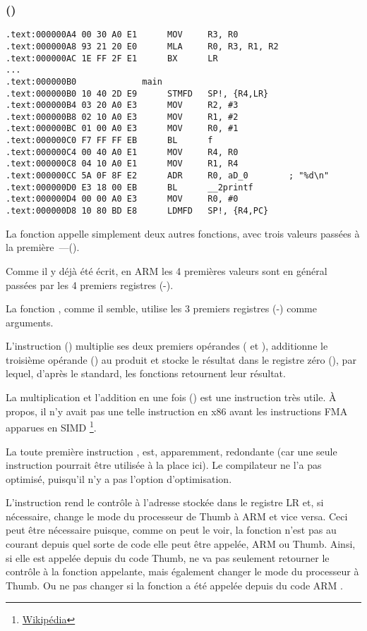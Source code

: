 \subsubsection{\NonOptimizingKeilVI (\ARMMode)}

\begin{lstlisting}[style=customasmARM]
.text:000000A4 00 30 A0 E1      MOV     R3, R0
.text:000000A8 93 21 20 E0      MLA     R0, R3, R1, R2
.text:000000AC 1E FF 2F E1      BX      LR
...
.text:000000B0             main
.text:000000B0 10 40 2D E9      STMFD   SP!, {R4,LR}
.text:000000B4 03 20 A0 E3      MOV     R2, #3
.text:000000B8 02 10 A0 E3      MOV     R1, #2
.text:000000BC 01 00 A0 E3      MOV     R0, #1
.text:000000C0 F7 FF FF EB      BL      f
.text:000000C4 00 40 A0 E1      MOV     R4, R0
.text:000000C8 04 10 A0 E1      MOV     R1, R4
.text:000000CC 5A 0F 8F E2      ADR     R0, aD_0        ; "%d\n"
.text:000000D0 E3 18 00 EB      BL      __2printf
.text:000000D4 00 00 A0 E3      MOV     R0, #0
.text:000000D8 10 80 BD E8      LDMFD   SP!, {R4,PC}
\end{lstlisting}

La fonction \main appelle simplement deux autres fonctions, avec trois valeurs passées
à la première~---(\ttf).

Comme il y déjà été écrit, en ARM les 4 premières valeurs sont en général
passées par les 4 premiers registres (-).

La fonction \ttf, comme il semble, utilise les 3 premiers registres (-) comme arguments. 

L'instruction  () multiplie ses deux premiers opérandes
( et ), additionne le troisième opérande () au produit et stocke
le résultat dans le registre zéro (), par lequel, d'après le standard, les
fonctions retournent leur résultat.

La multiplication et l'addition en une fois ()
est une instruction très utile. À propos, il n'y avait pas une telle instruction en
x86 avant les instructions FMA apparues en SIMD
\footnote{\href{http://go.yurichev.com/17103}{Wikipédia}}.

La toute première instruction , est, apparemment, redondante (car
une seule instruction  pourrait être utilisée à la place ici).
Le compilateur ne l'a pas optimisé, puisqu'il n'y a pas l'option d'optimisation.


L'instruction  rend le contrôle à l'adresse stockée dans le registre \ac{LR}
et, si nécessaire, change le mode du processeur de Thumb à ARM et vice versa.
Ceci peut être nécessaire puisque, comme on peut le voir, la fonction \ttf n'est
pas au courant depuis quel sorte de code elle peut être appelée, ARM ou Thumb.
Ainsi, si elle est appelée depuis du code Thumb,  ne va pas seulement retourner
le contrôle à la fonction appelante, mais également changer le mode du processeur
à Thumb.
Ou ne pas changer si la fonction a été appelée depuis du code ARM .
